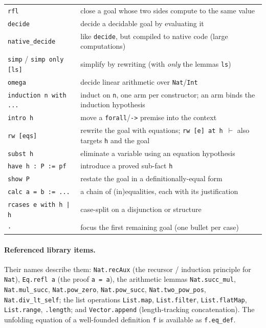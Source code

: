 \documentclass[11pt]{article}
\begin{document}
\begin{tabular}{@{}l@{\hspace{1.4em}}p{9cm}@{}}
\verb|rfl| & close a goal whose two sides compute to the same value \\[1.5pt]
\verb|decide| & decide a decidable goal by evaluating it \\[1.5pt]
\verb|native_decide| & like \texttt{decide}, but compiled to native code (large computations) \\[1.5pt]
\verb|simp| / \verb|simp only [ls]| & simplify by rewriting (with \emph{only} the lemmas \texttt{ls}) \\[1.5pt]
\verb|omega| & decide linear arithmetic over \texttt{Nat}/\texttt{Int} \\[1.5pt]
\verb|induction n with ...| & induct on \texttt{n}, one arm per constructor; an arm binds the induction hypothesis \\[1.5pt]
\verb|intro h| & move a \verb|forall|/\verb|->| premise into the context \\[1.5pt]
\verb|rw [eqs]| & rewrite the goal with equations; \verb|rw [e] at h |\(\vdash\) also targets \texttt{h} and the goal \\[1.5pt]
\verb|subst h| & eliminate a variable using an equation hypothesis \\[1.5pt]
\verb|have h : P := pf| & introduce a proved sub-fact \texttt{h} \\[1.5pt]
\verb|show P| & restate the goal in a definitionally-equal form \\[1.5pt]
\verb|calc a = b := ...| & a chain of (in)equalities, each with its justification \\[1.5pt]
\verb!rcases e with h | h! & case-split on a disjunction or structure \\[1.5pt]
\verb|·| & focus the first remaining goal (one bullet per case) \\
\end{tabular}

\paragraph{Referenced library items.} Their names describe them:
\texttt{Nat.recAux} (the recursor / induction principle for \texttt{Nat}),
\texttt{Eq.refl a} (the proof \texttt{a = a}), the arithmetic lemmas
\texttt{Nat.succ\_mul}, \texttt{Nat.mul\_succ}, \texttt{Nat.pow\_zero},
\texttt{Nat.pow\_succ}, \texttt{Nat.two\_pow\_pos}, \texttt{Nat.div\_lt\_self};
the list operations \texttt{List.map}, \texttt{List.filter},
\texttt{List.flatMap}, \texttt{List.range}, \texttt{.length}; and
\texttt{Vector.append} (length-tracking concatenation). The unfolding equation of
a well-founded definition \texttt{f} is available as \texttt{f.eq\_def}.

\printbibliography[heading=bibintoc,title={References}]
\end{document}

